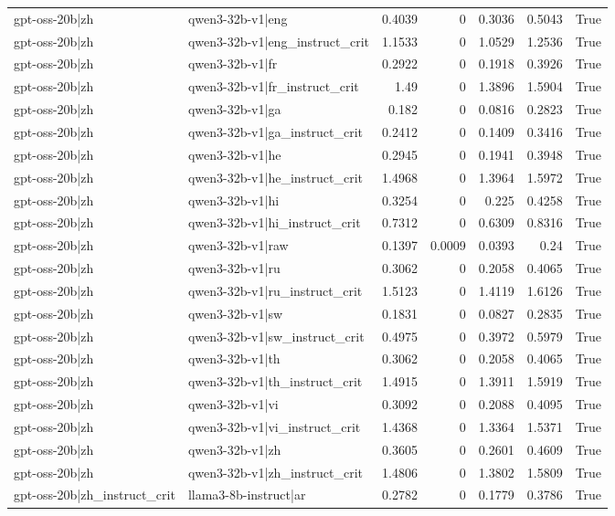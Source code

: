 \begin{table}
\begin{tabular}{l l r r r r l}
gpt-oss-20b|zh & qwen3-32b-v1|eng & 0.4039 & 0 & 0.3036 & 0.5043 & True \\
gpt-oss-20b|zh & qwen3-32b-v1|eng_instruct_crit & 1.1533 & 0 & 1.0529 & 1.2536 & True \\
gpt-oss-20b|zh & qwen3-32b-v1|fr & 0.2922 & 0 & 0.1918 & 0.3926 & True \\
gpt-oss-20b|zh & qwen3-32b-v1|fr_instruct_crit & 1.49 & 0 & 1.3896 & 1.5904 & True \\
gpt-oss-20b|zh & qwen3-32b-v1|ga & 0.182 & 0 & 0.0816 & 0.2823 & True \\
gpt-oss-20b|zh & qwen3-32b-v1|ga_instruct_crit & 0.2412 & 0 & 0.1409 & 0.3416 & True \\
gpt-oss-20b|zh & qwen3-32b-v1|he & 0.2945 & 0 & 0.1941 & 0.3948 & True \\
gpt-oss-20b|zh & qwen3-32b-v1|he_instruct_crit & 1.4968 & 0 & 1.3964 & 1.5972 & True \\
gpt-oss-20b|zh & qwen3-32b-v1|hi & 0.3254 & 0 & 0.225 & 0.4258 & True \\
gpt-oss-20b|zh & qwen3-32b-v1|hi_instruct_crit & 0.7312 & 0 & 0.6309 & 0.8316 & True \\
gpt-oss-20b|zh & qwen3-32b-v1|raw & 0.1397 & 0.0009 & 0.0393 & 0.24 & True \\
gpt-oss-20b|zh & qwen3-32b-v1|ru & 0.3062 & 0 & 0.2058 & 0.4065 & True \\
gpt-oss-20b|zh & qwen3-32b-v1|ru_instruct_crit & 1.5123 & 0 & 1.4119 & 1.6126 & True \\
gpt-oss-20b|zh & qwen3-32b-v1|sw & 0.1831 & 0 & 0.0827 & 0.2835 & True \\
gpt-oss-20b|zh & qwen3-32b-v1|sw_instruct_crit & 0.4975 & 0 & 0.3972 & 0.5979 & True \\
gpt-oss-20b|zh & qwen3-32b-v1|th & 0.3062 & 0 & 0.2058 & 0.4065 & True \\
gpt-oss-20b|zh & qwen3-32b-v1|th_instruct_crit & 1.4915 & 0 & 1.3911 & 1.5919 & True \\
gpt-oss-20b|zh & qwen3-32b-v1|vi & 0.3092 & 0 & 0.2088 & 0.4095 & True \\
gpt-oss-20b|zh & qwen3-32b-v1|vi_instruct_crit & 1.4368 & 0 & 1.3364 & 1.5371 & True \\
gpt-oss-20b|zh & qwen3-32b-v1|zh & 0.3605 & 0 & 0.2601 & 0.4609 & True \\
gpt-oss-20b|zh & qwen3-32b-v1|zh_instruct_crit & 1.4806 & 0 & 1.3802 & 1.5809 & True \\
gpt-oss-20b|zh_instruct_crit & llama3-8b-instruct|ar & 0.2782 & 0 & 0.1779 & 0.3786 & True \\

\end{tabular}
\end{table}
